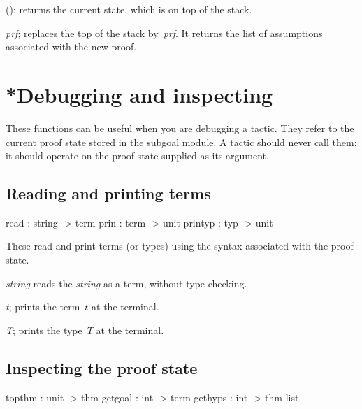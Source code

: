 \begin{ttdescription}
\item[\ttindexbold{save_proof}();]  
returns the current state, which is on top of the stack.

\item[\ttindexbold{restore_proof} {\it prf};]
  replaces the top of the stack by~{\it prf}.  It returns the list of
  assumptions associated with the new proof.
\end{ttdescription}


\section{*Debugging and inspecting}
These functions can be useful when you are debugging a tactic.  They refer
to the current proof state stored in the subgoal module.  A tactic
should never call them; it should operate on the proof state supplied as its
argument.

\subsection{Reading and printing terms}
\begin{ttbox} 
read    : string -> term
prin    : term -> unit
printyp : typ -> unit
\end{ttbox}
These read and print terms (or types) using the syntax associated with the
proof state.

\begin{ttdescription}
\item[\ttindexbold{read} {\it string}]  
reads the {\it string} as a term, without type-checking.

\item[\ttindexbold{prin} {\it t};]  
prints the term~$t$ at the terminal.

\item[\ttindexbold{printyp} {\it T};]  
prints the type~$T$ at the terminal.
\end{ttdescription}

\subsection{Inspecting the proof state}
\begin{ttbox} 
topthm  : unit -> thm
getgoal : int -> term
gethyps : int -> thm list
\end{ttbox}

